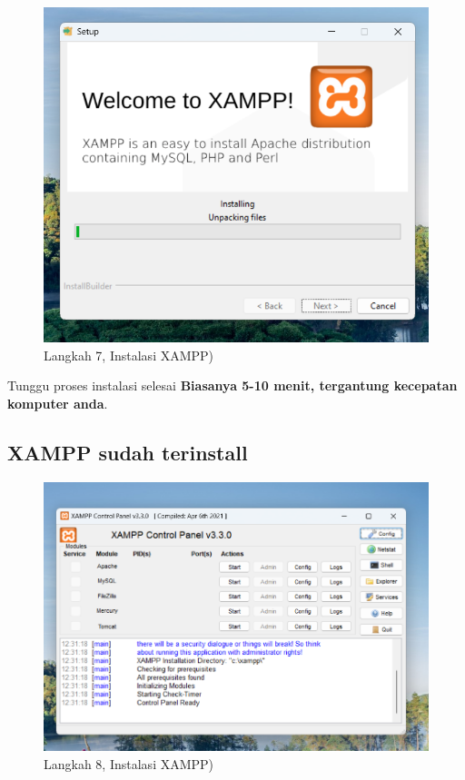 \documentclass[
]{book}
\begin{document}
\begin{figure}

{\centering \includegraphics[width=1\linewidth]{./images/Bab1/xampp6} 

}

\caption{Langkah 7, Instalasi XAMPP)}\label{fig:install-xammp6}
\end{figure}

Tunggu proses instalasi selesai \textbf{Biasanya 5-10 menit, tergantung kecepatan komputer anda}.

\hypertarget{xampp-sudah-terinstall}{%
\subsection{XAMPP sudah terinstall}\label{xampp-sudah-terinstall}}

\begin{figure}

{\centering \includegraphics[width=1\linewidth]{./images/Bab1/xampp7} 

}

\caption{Langkah 8, Instalasi XAMPP)}\label{fig:install-xammp7}
\end{figure}
\end{document}
